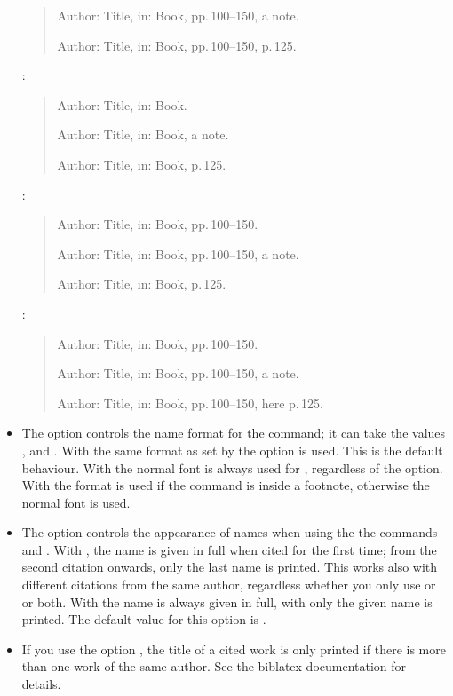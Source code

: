 \documentclass[english]{scrartcl}
\begin{document}
\begin{itemize}
\begin{quote}
				Author: Title, in: Book, pp.\,100--150, a note.

				Author: Title, in: Book, pp.\,100--150, p.\,125.
				\end{quote}
				:
				\begin{quote}
				Author: Title, in: Book.

				Author: Title, in: Book, a note.

				Author: Title, in: Book, p.\,125.
				\end{quote}
				:
				\begin{quote}
				Author: Title, in: Book, pp.\,100--150.

				Author: Title, in: Book, pp.\,100--150, a note.

				Author: Title, in: Book, p.\,125.
				\end{quote}
				:
				\begin{quote}
				Author: Title, in: Book, pp.\,100--150.

				Author: Title, in: Book, pp.\,100--150, a note.

				Author: Title, in: Book, pp.\,100--150, here p.\,125.
				\end{quote}
	\item The  option controls the name format for
				the  command; it can take the values , 
				 and . With  the 
				same format as set by the option  is used. This is the default 
				behaviour. With  the normal font is always used for 
				, regardless of the  option. With 
				 the  format is used if the
	       command is inside a footnote, otherwise the normal font is used.
	\item The option  controls the
				appearance of names when using the the commands  and .
				With , the name is given in full when cited for the 
				first time; from the second citation onwards, only the last name is printed. This 
				works also with different citations from the same author, regardless whether you 
				only use  or  or both. With 
         the name is always given in full, with 
         only the given name is printed.
        The default value for this option is .
	\item If you use the \bl{} option , the title of 
	      a cited work is only printed if there is more than one work of the same
				author. See the biblatex documentation for details.
\end{itemize}
\end{document}
